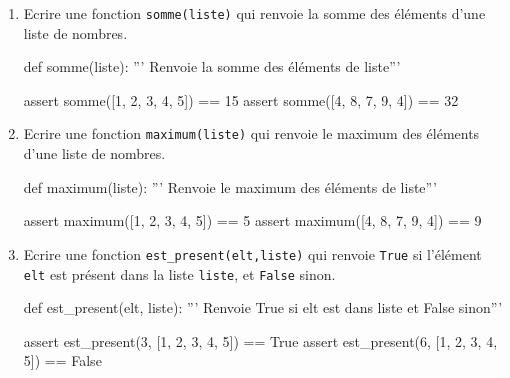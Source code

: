 \begin{exercice_cours}{}
	
	\begin{enumerate}
		\item Ecrire une fonction \texttt{somme(liste)} qui renvoie la somme des éléments d'une liste de nombres.
		
		\begin{CodePythontexAlt}[TaillePolice=\normalsize, Largeur=1\linewidth,Centre,PremLigne=1, Lignes=false,]{}
				def somme(liste):
					''' Renvoie la somme des éléments de liste'''







				
				assert somme([1, 2, 3, 4, 5]) == 15
				assert somme([4, 8, 7, 9, 4]) == 32
				\end{CodePythontexAlt}

		\item Ecrire une fonction \texttt{maximum(liste)} qui renvoie le maximum des éléments d'une liste de nombres.
		\begin{CodePythontexAlt}[TaillePolice=\normalsize, Largeur=1\linewidth,Centre,PremLigne=1, Lignes=false,]{}
				def maximum(liste):
					''' Renvoie le maximum des éléments de liste'''









				


				assert maximum([1, 2, 3, 4, 5]) == 5
				assert maximum([4, 8, 7, 9, 4]) == 9
				\end{CodePythontexAlt}
		\pagebreak

		\item Ecrire une fonction \texttt{est\_present(elt,liste)} qui renvoie \texttt{True} si l'élément \texttt{elt} est présent dans la liste \texttt{liste}, et \texttt{False} sinon.
		\begin{CodePythontexAlt}[TaillePolice=\normalsize, Largeur=1\linewidth,Centre,PremLigne=1, Lignes=false,]{}
				def est_present(elt, liste):
					''' Renvoie True si elt est dans liste et False sinon'''	









				
				assert est_present(3, [1, 2, 3, 4, 5]) == True
				assert est_present(6, [1, 2, 3, 4, 5]) == False
				\end{CodePythontexAlt}
	
	\end{enumerate}
\end{exercice_cours}

